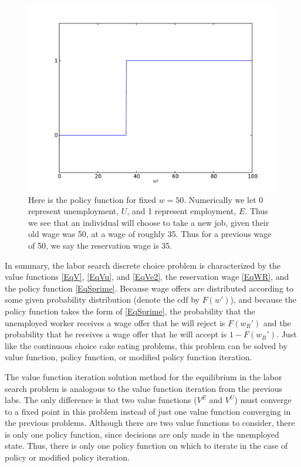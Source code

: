 \begin{figure}
\includegraphics[width=\textwidth]{disc_policy.pdf}
\caption{Here is the policy function for fixed $w = 50$.  Numerically we let 0 represent unemployment, $U$,
and 1 represent employment, $E$.  Thus we see that an individual will choose to take a new job, given
their old wage was 50, at a wage of roughly 35.  Thus for a previous wage of 50, we say the reservation wage is 35.}
\label{fig:disc_policy}
\end{figure}

In summary, the labor search discrete choice problem is characterized by the value functions \eqref{EqV}, \eqref{EqVu},
and \eqref{EqVe2}, the reservation wage \eqref{EqWR}, and the policy function \eqref{EqSprime}. Because wage offers
are distributed according to some given probability distribution (denote the cdf by $F(w')$),
and because the policy function takes the form of \eqref{EqSprime},
the probability that the unemployed worker receives a wage offer that he will reject is $F(w_R')$ and the probability
that he receives a wage offer that he will accept is $1 - F(w_R')$. Just like the continuous choice cake eating
problems, this problem can be solved by value function, policy function, or modified policy function iteration.

The value function iteration solution method for the equilibrium in the labor search problem is analogous to the
value function iteration from the previous labs. The only difference is that two value functions ($V^E$ and $V^U$)
must converge to a fixed point in this problem instead of just one value function converging in the previous problems.
Although there are two value functions to consider, there is only one policy function, since decisions are only made
in the unemployed state.  Thus, there is only one policy function on which to iterate in the case of policy or modified
policy iteration.

